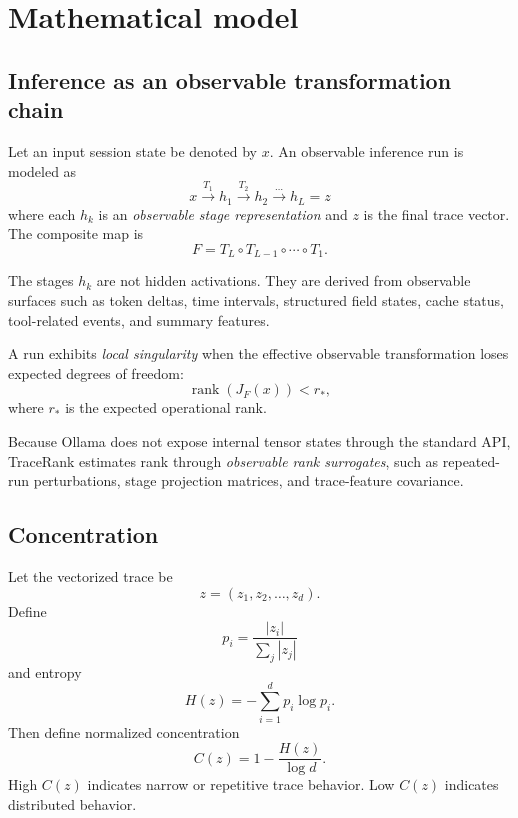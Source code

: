     \section{Mathematical model}
    \subsection{Inference as an observable transformation chain}
    Let an input session state be denoted by $x$. An observable inference run is modeled as
    \begin{equation}
      x \xrightarrow{T_1} h_1 \xrightarrow{T_2} h_2 \xrightarrow{\cdots} h_L = z
    \end{equation}
    where each $h_k$ is an \emph{observable stage representation} and $z$ is the final trace vector. The composite map is
    \begin{equation}
      F = T_L \circ T_{L-1} \circ \cdots \circ T_1.
    \end{equation}
    
    The stages $h_k$ are not hidden activations. They are derived from observable surfaces such as token deltas, time intervals, structured field states, cache status, tool-related events, and summary features.
    
    \begin{definition}
    A run exhibits \emph{local singularity} when the effective observable transformation loses expected degrees of freedom:
    \begin{equation}
    \operatorname{rank}(J_F(x)) < r_* ,
    \end{equation}
    where $r_*$ is the expected operational rank.
    \end{definition}
    
    Because Ollama does not expose internal tensor states through the standard API, TraceRank estimates rank through \emph{observable rank surrogates}, such as repeated-run perturbations, stage projection matrices, and trace-feature covariance.
    
    \subsection{Concentration}
    Let the vectorized trace be
    \begin{equation}
      z = (z_1, z_2, \dots, z_d).
    \end{equation}
    Define
    \begin{equation}
      p_i = \frac{|z_i|}{\sum_j |z_j|}
    \end{equation}
    and entropy
    \begin{equation}
      H(z) = -\sum_{i=1}^{d} p_i \log p_i.
    \end{equation}
    Then define normalized concentration
    \begin{equation}
      C(z) = 1 - \frac{H(z)}{\log d}.
    \end{equation}
    High $C(z)$ indicates narrow or repetitive trace behavior. Low $C(z)$ indicates distributed behavior.
    

